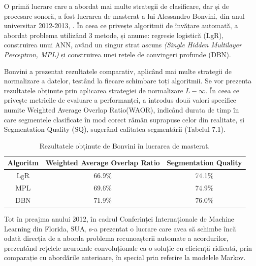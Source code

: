 \documentclass[a4paper,12pt]{report}
\begin{document}
O primă lucrare care a abordat mai multe strategii de clasificare, dar și de procesare sonoră,
a fost lucrarea de masterat a lui Alessandro Bonvini, din anul universitar 2012-2013, \cite{Bonvini-Recognition}.
În ceea ce privește algoritmii de învățare automată, a abordat problema utilizând 
3 metode, și anume: regresie logistică (LgR), construirea unui ANN, având un singur strat ascuns 
\emph{(Single Hidden Multilayer Perceptron, MPL)} și construirea unei rețele de convingeri profunde (DBN).

Bonvini a prezentat rezultatele comparativ, aplicând mai multe strategii de normalizare a datelor,
testând la fiecare schimbare toți algoritmii. Se vor prezenta rezultatele obținute 
prin aplicarea strategiei de normalizare $L-\infty$. În ceea ce privește metricile de evaluare 
a performanței, a introdus două valori specifice numite Weighted Average Overlap Ratio(WAOR),  
indicând durata de timp în care segmentele clasificate în mod corect rămân suprapuse 
celor din realitate, și Segmentation Quality (SQ), sugerând calitatea segmentării (Tabelul 7.1).

\begin{table}[h!]
    \begin{center}
        \begin{tabular}{ | c | c | c | }
            \hline 
                Algoritm & Weighted Average Overlap Ratio & Segmentation Quality\\
                \hline \hline 
                LgR & 66.9\% & 74.1\% \\
                \hline
                MPL & 69.6\% & 74.9\% \\
                \hline
                DBN & 71.9\% & 76.0\% \\
            \hline
        \end{tabular}
        \caption{Rezultatele obținute de Bonvini în lucrarea de masterat.}
    \end{center}
\end{table}

Tot în preajma anului 2012, în cadrul Conferinței Internaționale de Machine Learning din Florida, SUA,
s-a prezentat o lucrare care avea să schimbe încă odată direcția de a aborda problema 
recunoașterii automate a acordurilor, prezentând rețelele neuronale convoluționale 
ca o soluție cu eficiență ridicată, prin comparație cu abordările anterioare, în special
prin referire la modelele Markov. 
\end{document}
